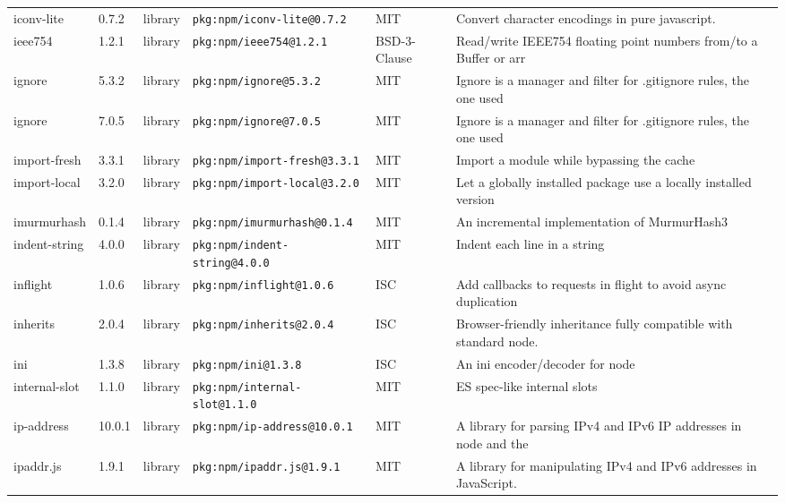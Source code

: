\documentclass[11pt,a4paper]{article}
\begin{document}
\begin{longtable}{|p{4cm}|p{2cm}|p{1.6cm}|p{5cm}|p{1.5cm}|p{3.5cm}|}
\raggedright iconv-lite & 0.7.2 & library & \small\texttt{pkg:npm/iconv-lite@0.7.2} & MIT & \small Convert character encodings in pure javascript. \\
\raggedright ieee754 & 1.2.1 & library & \small\texttt{pkg:npm/ieee754@1.2.1} & BSD-3-Clause & \small Read/write IEEE754 floating point numbers from/to a Buffer or arr \\
\raggedright ignore & 5.3.2 & library & \small\texttt{pkg:npm/ignore@5.3.2} & MIT & \small Ignore is a manager and filter for .gitignore rules, the one used \\
\raggedright ignore & 7.0.5 & library & \small\texttt{pkg:npm/ignore@7.0.5} & MIT & \small Ignore is a manager and filter for .gitignore rules, the one used \\
\raggedright import-fresh & 3.3.1 & library & \small\texttt{pkg:npm/import-fresh@3.3.1} & MIT & \small Import a module while bypassing the cache \\
\raggedright import-local & 3.2.0 & library & \small\texttt{pkg:npm/import-local@3.2.0} & MIT & \small Let a globally installed package use a locally installed version  \\
\raggedright imurmurhash & 0.1.4 & library & \small\texttt{pkg:npm/imurmurhash@0.1.4} & MIT & \small An incremental implementation of MurmurHash3 \\
\raggedright indent-string & 4.0.0 & library & \small\texttt{pkg:npm/indent-string@4.0.0} & MIT & \small Indent each line in a string \\
\raggedright inflight & 1.0.6 & library & \small\texttt{pkg:npm/inflight@1.0.6} & ISC & \small Add callbacks to requests in flight to avoid async duplication \\
\raggedright inherits & 2.0.4 & library & \small\texttt{pkg:npm/inherits@2.0.4} & ISC & \small Browser-friendly inheritance fully compatible with standard node. \\
\raggedright ini & 1.3.8 & library & \small\texttt{pkg:npm/ini@1.3.8} & ISC & \small An ini encoder/decoder for node \\
\raggedright internal-slot & 1.1.0 & library & \small\texttt{pkg:npm/internal-slot@1.1.0} & MIT & \small ES spec-like internal slots \\
\raggedright ip-address & 10.0.1 & library & \small\texttt{pkg:npm/ip-address@10.0.1} & MIT & \small A library for parsing IPv4 and IPv6 IP addresses in node and the  \\
\raggedright ipaddr.js & 1.9.1 & library & \small\texttt{pkg:npm/ipaddr.js@1.9.1} & MIT & \small A library for manipulating IPv4 and IPv6 addresses in JavaScript. \\

\end{longtable}
\end{document}

